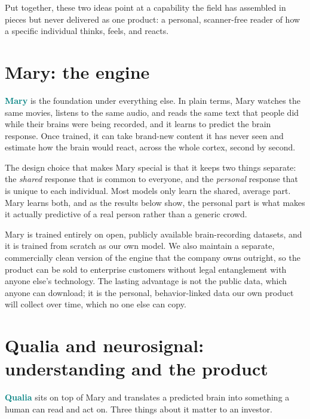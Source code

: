 \documentclass[11pt]{article}
\newcommand{\keyterm}[1]{\textcolor{teal}{\textbf{#1}}}
\begin{document}
Put together, these two ideas point at a capability the field has assembled in pieces but
never delivered as one product: a personal, scanner-free reader of how a specific individual
thinks, feels, and reacts.

\section{Mary: the engine}

\keyterm{Mary} is the foundation under everything else. In plain terms, Mary watches the
same movies, listens to the same audio, and reads the same text that people did while their
brains were being recorded, and it learns to predict the brain response. Once trained, it
can take brand-new content it has never seen and estimate how the brain would react, across
the whole cortex, second by second.

The design choice that makes Mary special is that it keeps two things separate: the
\emph{shared} response that is common to everyone, and the \emph{personal} response that is
unique to each individual. Most models only learn the shared, average part. Mary learns both,
and as the results below show, the personal part is what makes it actually predictive of a
real person rather than a generic crowd.

Mary is trained entirely on open, publicly available brain-recording datasets, and it is
trained from scratch as our own model. We also maintain a separate, commercially clean
version of the engine that the company owns outright, so the product can be sold to
enterprise customers without legal entanglement with anyone else's technology. The lasting
advantage is not the public data, which anyone can download; it is the personal,
behavior-linked data our own product will collect over time, which no one else can copy.

\section{Qualia and neurosignal: understanding and the product}

\keyterm{Qualia} sits on top of Mary and translates a predicted brain into something a human
can read and act on. Three things about it matter to an investor.
\end{document}

